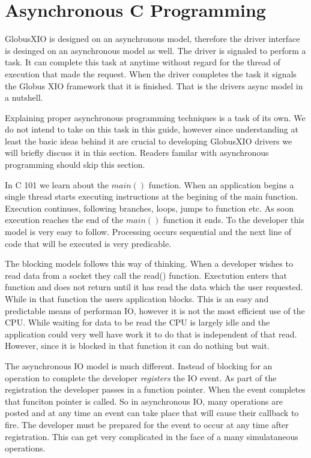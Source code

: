 \documentclass[11pt]{article}
\begin{document}
\section{Asynchronous C Programming}
GlobusXIO is designed on an asynchronous model, therefore
the driver interface is desinged on an asynchronous model as well.
The driver is signaled to perform a task.  It can complete this
task at anytime without regard for the thread of execution that
made the request.  When the driver completes the task it signals
the Globus XIO framework that it is finished.  That is the drivers 
async model in a nutshell.  

Explaining
proper asynchronous programming techniques is a task of its own.  We
do not intend to take on this task in this guide, however since 
understanding at least the basic ideas behind it are crucial to 
developing GlobusXIO drivers we will briefly discuss it in this section.
Readers familar with asynchronous programming should skip this section.

In C 101 we learn about the $main()$ function.  When an application 
begins a single thread starts executing instructions at the begining
of the main function.  Execution continues, following branches, loops,
jumps to function etc.  As soon execution reaches the end of the $main()$
function it ends.  To the developer this model is very easy to follow.
Processing occurs sequential and the next line of code that will be executed
is very predicable.

The blocking models follows this way of thinking.  When a developer wishes
to read data from a socket they call the read() function.  Exectution 
enters that function and does not return until it has read the data which
the user requested.  While in that function the users application 
blocks.  This is an easy and predictable means of performan IO, however
it is not the most efficient use of the CPU.  While waiting for data
to be read the CPU is largely idle and the application could very well
have work it to do that is independent of that read.  However, since
it is blocked in that function it can do nothing but wait.

The asynchronous IO model is much different.  Instead of blocking
for an operation to complete the developer \emph{registers} the IO event.
As part of the registration the developer passes in a function pointer.
When the event completes that funciton pointer is called.  So in 
asynchronous IO, many operations are posted and at any time an event
can take place that will cause their callback to fire.  The developer
must be prepared for the event to occur at any time after registration.
This can get very complicated in the face of a many simulataneous
operations.
\end{document}
